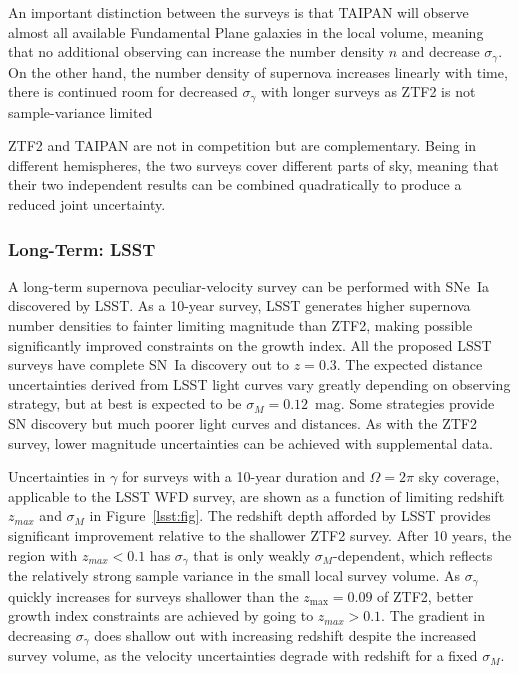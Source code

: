 \documentclass[11pt, oneside]{article}   	%
\begin{document}
An important distinction between the surveys is
that TAIPAN will observe almost all available Fundamental Plane galaxies in the local volume, meaning that no additional observing can
increase the number density $n$ and decrease $\sigma_\gamma$.  On the other hand, the number density of supernova increases
linearly with time, there is continued room for decreased $\sigma_\gamma$ with longer surveys  as ZTF2 is not  sample-variance limited 


ZTF2 and TAIPAN are not in competition but are complementary.  Being in different hemispheres, the two surveys
cover different parts of sky, meaning that their two independent results can be
combined  quadratically to produce a reduced joint uncertainty. 

\subsubsection{Long-Term: LSST}
A long-term supernova peculiar-velocity survey can be performed with SNe~Ia discovered by LSST.
As a 10-year survey, LSST generates higher supernova number densities to fainter limiting magnitude than  ZTF2,
making possible significantly improved constraints on the growth index.
All the proposed LSST surveys have complete SN~Ia discovery out to $z=0.3$.
The expected distance uncertainties derived from LSST light curves vary greatly depending on observing strategy, but at best
is expected to be $\sigma_M=0.12$~mag. Some strategies provide SN discovery but much poorer light curves
and distances.   As with the ZTF2 survey,  lower magnitude uncertainties
can be achieved with supplemental data.

Uncertainties in $\gamma$ for surveys with a 10-year duration   and $\Omega=2\pi$ sky coverage, applicable to the LSST WFD survey, 
are shown as a function of limiting  redshift $z_{max}$ and $\sigma_M$ in Figure~\ref{lsst:fig}.
The redshift depth afforded by LSST provides significant improvement relative to the shallower ZTF2 survey.
After 10 years, the region with $z_{max}<0.1$ has $\sigma_\gamma$ that is only weakly $\sigma_M$-dependent, 
which reflects the relatively strong sample variance in the small local survey volume.  
As $\sigma_\gamma$ quickly increases for surveys shallower than the $z_{\text{max}}=0.09$ 
of ZTF2,
better growth index constraints
are achieved by going to $z_{max}>0.1$.
The gradient in decreasing $\sigma_\gamma$ does shallow out with increasing redshift despite the increased survey volume, 
as the velocity uncertainties degrade with redshift for a fixed $\sigma_M$.
\end{document}
